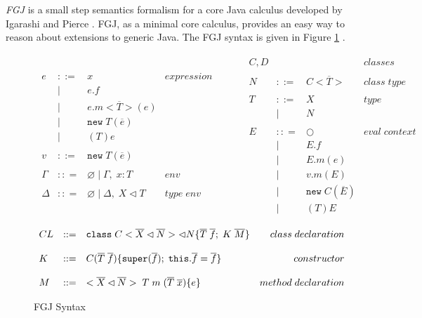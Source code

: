 \documentclass[11pt
              , a4paper
              , twoside
              , openright
              ]{report}
\begin{document}
\emph{FGJ} is a small step semantics formalism for a core Java calculus developed by Igarashi and Pierce \cite{FGJ}. FGJ, as a minimal core calculus, provides an easy way to reason about extensions to generic Java. The FGJ syntax is given in Figure \ref{f:fgj_syntax} .
\begin{figure}[h]
\[
\begin{array}{lll}
\begin{array}{lllr}
e & ::= & x & expression \\
& | & e.f &\\
& | & e.m<\overline{T}>(e) &\\
& | & \texttt{new} \; T(\overline{e})&\\
& | & (T) e &\\
&&\\
v & ::= & \texttt{new} \; T(\overline{e})&\\
&&\\
\Gamma & :: = & \varnothing \; | \; \Gamma,\; x : T & env \\
&&\\
\Delta & :: = & \varnothing \; | \; \Delta,\; X \lhd T & type \; env \\
 \end{array}
& ~~~~~~
&
\begin{array}{lllr}
C, D &  &  & classes \\
&&\\
N & ::= & C <\overline{T}> & class \; type\\
&&\\
T & ::= & X & type \\
       & | & N\\
&&\\
E & :: = & \bigcirc & eval \; context\\
       & | & E.f\\
       & | & E.m(e)\\
       & | & v.m(E)\\
	   & | & \texttt{new} \; C(\overline{E})\\
       & | & (T)E\\
\end{array}
\end{array}
\]
\[
\begin{array}{lllr}
CL & ::= & \verb|class| \; C <\overline{X} \lhd \overline{N}> \lhd N \{\overline{T} \; \overline{f}; \; K \; \overline{M}\}  & class \; declaration\\
$$\\
K & ::= & C(\overline{T}\; \overline{f})\{\verb|super|(\overline{f}); \; \verb|this|.\overline{f} = \overline{f}\}  & constructor\\
$$\\
M & ::= & <\overline{X} \lhd \overline{N}> \; T \; m \; (\overline{T}\; \overline{x})\{e\}  & method \; declaration\\
\end{array}
\]
\caption{FGJ Syntax}
\label{f:fgj_syntax}
\end{figure}
\end{document}
